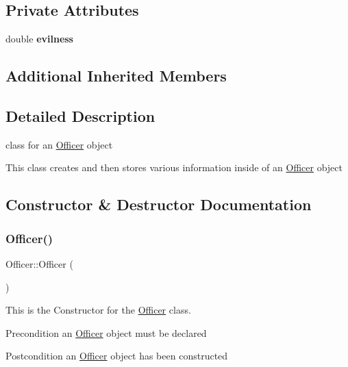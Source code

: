 \subsection*{Private Attributes}
\begin{DoxyCompactItemize}
\item 
\mbox{\label{classOfficer_a63465c5f16e8148e5bc0a3bb4ecd1781}} 
double {\bfseries evilness}
\end{DoxyCompactItemize}
\subsection*{Additional Inherited Members}


\subsection{Detailed Description}
class for an \hyperlink{classOfficer}{Officer} object 

This class creates and then stores various information inside of an \hyperlink{classOfficer}{Officer} object 

\subsection{Constructor \& Destructor Documentation}
\mbox{\label{classOfficer_a80ac1e36a3f36c3a7e12b5dc9320ad89}} 
\subsubsection{\texorpdfstring{Officer()}{Officer()}\hspace{0.1cm}{\footnotesize\ttfamily [1/2]}}
{\footnotesize\ttfamily Officer\+::\+Officer (\begin{DoxyParamCaption}{ }\end{DoxyParamCaption})}

This is the Constructor for the \hyperlink{classOfficer}{Officer} class.

\begin{DoxyPrecond}{Precondition}
an \hyperlink{classOfficer}{Officer} object must be declared 
\end{DoxyPrecond}
\begin{DoxyPostcond}{Postcondition}
an \hyperlink{classOfficer}{Officer} object has been constructed 
\end{DoxyPostcond}
\mbox{\label{classOfficer_ac75c45d6e8628606278cb4ce6596f67f}} 
